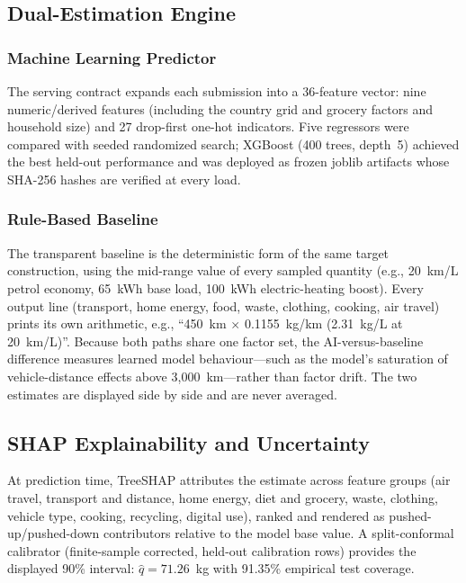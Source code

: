 \documentclass[conference]{IEEEtran}
\begin{document}
\subsection{Dual-Estimation Engine}

\subsubsection{Machine Learning Predictor}
The serving contract expands each submission into a 36-feature vector: nine numeric/derived features (including the country grid and grocery factors and household size) and 27 drop-first one-hot indicators. Five regressors were compared with seeded randomized search; XGBoost (400 trees, depth~5) achieved the best held-out performance and was deployed as frozen joblib artifacts whose SHA-256 hashes are verified at every load.

\subsubsection{Rule-Based Baseline}
The transparent baseline is the deterministic form of the same target construction, using the mid-range value of every sampled quantity (e.g., 20~km/L petrol economy, 65~kWh base load, 100~kWh electric-heating boost). Every output line (transport, home energy, food, waste, clothing, cooking, air travel) prints its own arithmetic, e.g., ``450~km $\times$ 0.1155~kg/km (2.31~kg/L at 20~km/L)''. Because both paths share one factor set, the AI-versus-baseline difference measures learned model behaviour---such as the model's saturation of vehicle-distance effects above 3{,}000~km---rather than factor drift. The two estimates are displayed side by side and are never averaged.

\subsection{SHAP Explainability and Uncertainty}

At prediction time, TreeSHAP \cite{lundberg2017} attributes the estimate across feature groups (air travel, transport and distance, home energy, diet and grocery, waste, clothing, vehicle type, cooking, recycling, digital use), ranked and rendered as pushed-up/pushed-down contributors relative to the model base value. A split-conformal calibrator (finite-sample corrected, held-out calibration rows) provides the displayed 90\% interval: $\hat{q} = 71.26$~kg with 91.35\% empirical test coverage.
\end{document}

